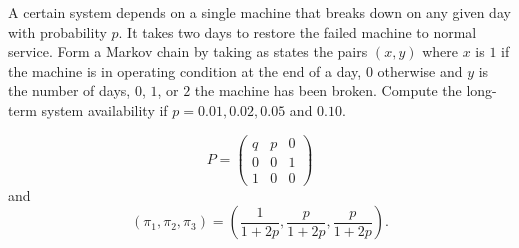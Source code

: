 \documentclass[12pt]{article}
\begin{document}
\begin{exercise}
    A certain system depends on a single machine that breaks down on any
    given day with probability \( p \).  It takes two days to restore
    the failed machine to normal service.  Form a Markov chain by taking
    as states the pairs \( (x,y) \) where \( x \) is \( 1 \) if the
    machine is in operating condition at the end of a day, \( 0 \)
    otherwise and \( y \) is the number of days, \( 0 \), \( 1 \), or \(
    2 \) the machine has been broken.  Compute the long-term system
    availability if \( p = 0.01, 0.02, 0.05 \) and \( 0.10 \).
\end{exercise}
\begin{solution}
    \[
        P =
        \begin{pmatrix}
            q & p & 0 \\
            0 & 0 & 1 \\
            1 & 0 & 0
        \end{pmatrix}
    \] and
    \[
        (\pi_1, \pi_2,\pi_3) = \left( \frac{1}{1+2p}, \frac{p}{1+2p},
        \frac{p}{1 + 2p} \right).
    \]
\end{solution}
\end{document}
